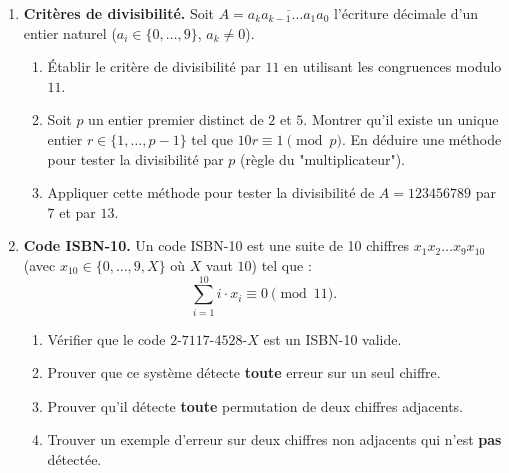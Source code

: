 \documentclass[11pt]{article}
\begin{document}
\begin{exercice}
\begin{enumerate}
    \item \textbf{Critères de divisibilité.} Soit $A = \overline{a_k a_{k-1} \dots a_1 a_0}$ l'écriture décimale d'un entier naturel ($a_i \in \{0,\dots,9\}$, $a_k \neq 0$).
    \begin{enumerate}
        \item Établir le critère de divisibilité par $11$ en utilisant les congruences modulo $11$.
        \item Soit $p$ un entier premier distinct de $2$ et $5$. Montrer qu'il existe un unique entier $r \in \{1,\dots,p-1\}$ tel que $10r \equiv 1 \pmod p$. En déduire une méthode pour tester la divisibilité par $p$ (règle du "multiplicateur").
        \item Appliquer cette méthode pour tester la divisibilité de $A = 123456789$ par $7$ et par $13$.
    \end{enumerate}
    \item \textbf{Code ISBN-10.} Un code ISBN-10 est une suite de 10 chiffres $x_1 x_2 \dots x_9 x_{10}$ (avec $x_{10} \in \{0,\dots,9,X\}$ où $X$ vaut $10$) tel que :
    \[
    \sum_{i=1}^{10} i \cdot x_i \equiv 0 \pmod{11}.
    \]
    \begin{enumerate}
        \item Vérifier que le code $2\text{-}7117\text{-}4528\text{-}X$ est un ISBN-10 valide.
        \item Prouver que ce système détecte \textbf{toute} erreur sur un seul chiffre.
        \item Prouver qu'il détecte \textbf{toute} permutation de deux chiffres adjacents.
        \item Trouver un exemple d'erreur sur deux chiffres non adjacents qui n'est \textbf{pas} détectée.
    \end{enumerate}
\end{enumerate}
\end{exercice}
\end{document}
